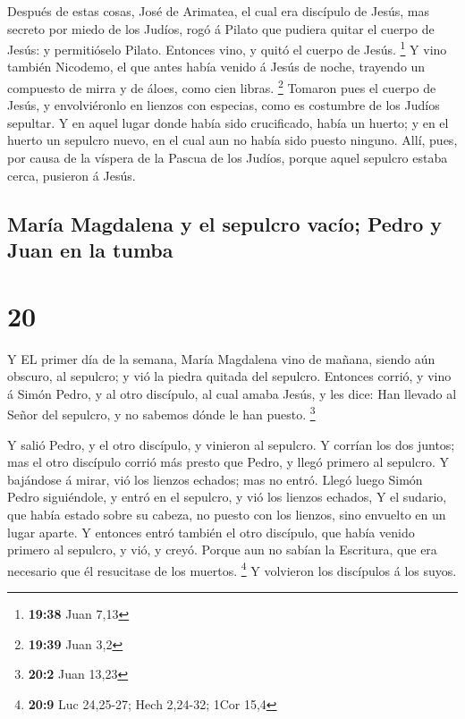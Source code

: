  Después de estas cosas, José de Arimatea, el cual era
discípulo de Jesús, mas secreto por miedo de los Judíos, rogó á Pilato
que pudiera quitar el cuerpo de Jesús: y permitióselo Pilato. Entonces
vino, y quitó el cuerpo de Jesús. \footnote{\textbf{19:38} Juan 7,13}
 Y vino también Nicodemo, el que antes había venido á Jesús
de noche, trayendo un compuesto de mirra y de áloes, como cien libras.
\footnote{\textbf{19:39} Juan 3,2}  Tomaron pues el cuerpo
de Jesús, y envolviéronlo en lienzos con especias, como es costumbre de
los Judíos sepultar.  Y en aquel lugar donde había sido
crucificado, había un huerto; y en el huerto un sepulcro nuevo, en el
cual aun no había sido puesto ninguno.  Allí, pues, por
causa de la víspera de la Pascua de los Judíos, porque aquel sepulcro
estaba cerca, pusieron á Jesús.

\hypertarget{maruxeda-magdalena-y-el-sepulcro-vacuxedo-pedro-y-juan-en-la-tumba}{%
\subsection{María Magdalena y el sepulcro vacío; Pedro y Juan en la
tumba}\label{maruxeda-magdalena-y-el-sepulcro-vacuxedo-pedro-y-juan-en-la-tumba}}

\hypertarget{section-19}{%
\section{20}\label{section-19}}

 Y EL primer día de la semana, María Magdalena vino de
mañana, siendo aún obscuro, al sepulcro; y vió la piedra quitada del
sepulcro.  Entonces corrió, y vino á Simón Pedro, y al otro
discípulo, al cual amaba Jesús, y les dice: Han llevado al Señor del
sepulcro, y no sabemos dónde le han puesto. \footnote{\textbf{20:2} Juan
  13,23}

 Y salió Pedro, y el otro discípulo, y vinieron al sepulcro.
 Y corrían los dos juntos; mas el otro discípulo corrió más
presto que Pedro, y llegó primero al sepulcro.  Y bajándose
á mirar, vió los lienzos echados; mas no entró.  Llegó luego
Simón Pedro siguiéndole, y entró en el sepulcro, y vió los lienzos
echados,  Y el sudario, que había estado sobre su cabeza, no
puesto con los lienzos, sino envuelto en un lugar aparte.  Y
entonces entró también el otro discípulo, que había venido primero al
sepulcro, y vió, y creyó.  Porque aun no sabían la
Escritura, que era necesario que él resucitase de los muertos.
\footnote{\textbf{20:9} Luc 24,25-27; Hech 2,24-32; 1Cor 15,4}
 Y volvieron los discípulos á los suyos.

